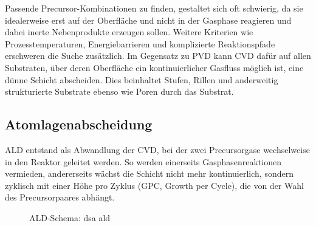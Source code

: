 Passende Precursor-Kombinationen zu finden, gestaltet sich oft schwierig, da sie idealerweise erst auf der Oberfläche und nicht in der Gasphase reagieren und dabei inerte Nebenprodukte erzeugen sollen.
Weitere Kriterien wie Prozesstemperaturen, Energiebarrieren und komplizierte Reaktionspfade erschweren die Suche zusätzlich.
Im Gegensatz zu PVD kann CVD dafür auf allen Substraten, über deren Oberfläche ein kontinuierlicher Gasfluss möglich ist, eine dünne Schicht abscheiden.
Dies beinhaltet Stufen, Rillen und anderweitig strukturierte Substrate ebenso wie Poren durch das Substrat.

\subsection{Atomlagenabscheidung}

ALD entstand als Abwandlung der CVD, bei der zwei Precursorgase wechselweise in den Reaktor geleitet werden.
So werden einerseits Gasphasenreaktionen vermieden, andererseits wächst die Schicht nicht mehr kontinuierlich, sondern zyklisch mit einer Höhe pro Zyklus (GPC, Growth per Cycle), die von der Wahl des Precursorpaares abhängt.

\begin{figure}
  \def\svgwidth{\textwidth}
  
  \caption[ALD-Schema]{ALD-Schema: dsa ald}
  \label{fig:ald-schema}
\end{figure}
